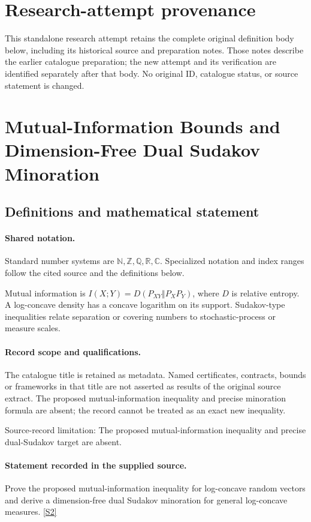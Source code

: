 \documentclass[11pt]{article}
\begin{document}
\section*{Research-attempt provenance}
This standalone research attempt retains the complete original definition body below,
including its historical source and preparation notes. Those notes describe the
earlier catalogue preparation; the new attempt and its verification are identified
separately after that body. No original ID, catalogue status, or source statement is changed.

\section{Mutual-Information Bounds and Dimension-Free Dual Sudakov Minoration}\label{statement}

\subsection{Definitions and mathematical statement}

\paragraph{Shared notation.}Standard number systems are $\mathbb N,\mathbb Z,\mathbb Q,\mathbb R,\mathbb C$. Specialized notation and index ranges follow the cited source and the definitions below.


Mutual information is $I(X;Y)=D(P_{XY}\Vert P_XP_Y)$, where $D$ is relative entropy. A log-concave density has a concave logarithm on its support. Sudakov-type inequalities relate separation or covering numbers to stochastic-process or measure scales.
\paragraph{Record scope and qualifications.}
The catalogue title is retained as metadata. Named certificates, contracts, bounds or frameworks in that title are not asserted as results of the original source extract.
The proposed mutual-information inequality and precise minoration formula are absent; the record cannot be treated as an exact new inequality.

Source-record limitation: The proposed mutual-information inequality and precise dual-Sudakov target are absent.
\paragraph{Statement recorded in the supplied source.}
Prove the proposed mutual-information inequality for log-concave random vectors and derive a dimension-free dual Sudakov minoration for general log-concave measures. \href{https://doi.org/10.4171/owr/2022/14}{[S2]}
\end{document}
